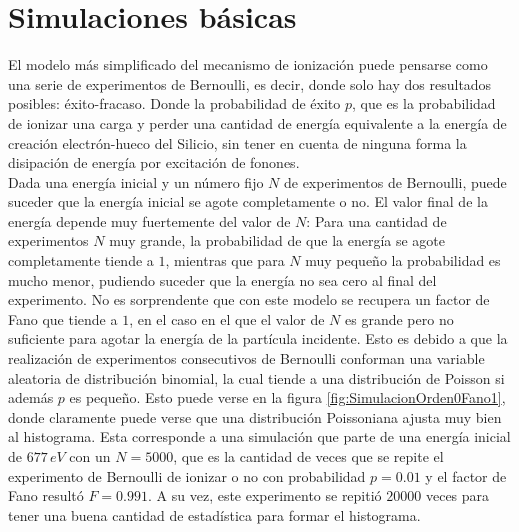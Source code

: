 \section{Simulaciones básicas}
\noindent El modelo más simplificado del mecanismo de ionización puede pensarse como una serie de experimentos de Bernoulli, es decir, donde solo hay dos resultados posibles: éxito-fracaso. Donde la probabilidad de éxito $p$, que es la probabilidad de ionizar una carga y perder una cantidad de energía equivalente a la energía de creación electrón-hueco del Silicio, sin tener en cuenta de ninguna forma la disipación de energía por excitación de fonones.\\
\indent Dada una energía inicial y un número fijo $N$ de experimentos de Bernoulli, puede suceder que la energía inicial se agote completamente o no. El valor final de la energía depende muy fuertemente del valor de $N$: Para una cantidad de experimentos $N$ muy grande, la probabilidad de que la energía se agote completamente tiende a $1$, mientras que para $N$ muy pequeño la probabilidad es mucho menor, pudiendo suceder que la energía no sea cero al final del experimento. No es sorprendente que con este modelo se recupera un factor de Fano que tiende a $1$, en el caso en el que el valor de $N$ es grande pero no suficiente para agotar la energía de la partícula incidente. Esto es debido a que la realización de experimentos consecutivos de Bernoulli conforman una variable aleatoria de distribución binomial, la cual tiende a una distribución de Poisson si además $p$ es pequeño. Esto puede verse en la figura \ref{fig:SimulacionOrden0Fano1}, donde claramente puede verse que una distribución Poissoniana ajusta muy bien al histograma. Esta corresponde a una simulación que parte de una energía inicial de $677\,\si{eV}$ con un $N = 5000$, que es la cantidad de veces que se repite el experimento de Bernoulli de ionizar o no con probabilidad $p=0.01$ y el factor de Fano resultó $F = 0.991$. A su vez, este experimento se repitió $20000$ veces para tener una buena cantidad de estadística para formar el histograma.\\
